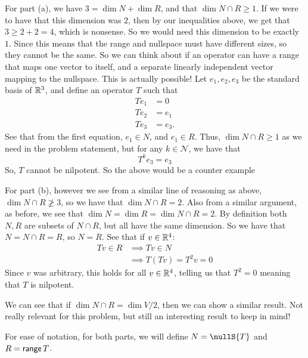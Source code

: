 \documentclass[answers]{exam}
\begin{document}
\begin{questions}
\begin{solution}
        For part (a), we have $3 = \dim{N} + \dim{R}$, and that $\dim{N\cap R} \geq 1$. If we were to have that
        this dimension was $2$, then by our inequalities above, we get that $3\geq 2 + 2 = 4$, which is nonsense. 
        So we would need this dimension to be exactly $1$. Since this means that the range and nullspace must have
        different sizes, so they cannot be the same. So we can think about if an operator can have a range that maps
        one vector to itself, and a separate linearly independent vector mapping to the nullspace. This is 
        actually possible! Let $e_1,e_2,e_3$ be the standard basis of $\mathbb{R}^3$, and define an operator $T$ such that
        \begin{align*}
            Te_1 &= 0\\
            Te_2 &= e_1\\
            Te_3 &= e_3.
        \end{align*}
        See that from the first equation, $e_1\in N$, and $e_1\in R$. Thus, $\dim{N\cap R}\geq 1$ as we need in
        the problem statement, but for any $k\in\mathcal{N}$, we have that 
        \[
            T^ke_3 = e_3
        \]
        So, $T$ cannot be nilpotent. So the above would be a counter example

        For part (b), however we see from a similar line of reasoning as above, $\dim{N\cap R} \not\geq 3$, so we 
        have that $\dim{N\cap R} = 2$. Also from a similar argument, as before, we see that $\dim{N} = \dim{R} =
        \dim{N\cap R} = 2$. By definition both $N,R$ are subsets of $N\cap R$, but all have the same dimension.
        So we have that $N = N\cap R = R$, so $N = R$. See that if $v\in \mathbb{R}^4$:
        \begin{align*}
            Tv\in R &\implies Tv\in N \\
            &\implies T(Tv) = T^2v = 0
        \end{align*}
        Since $v$ was arbitrary, this holds for all $v\in\mathbb{R}^4$, telling us that $T^2=0$ meaning that $T$ is 
        nilpotent.

         We can see that if $\dim{N\cap R} = \dim{V}/2$, then we can show a similar result. Not
        really relevant for this problem, but still an interesting result to keep in mind!



        For ease of notation, for both parts, we will define $N = \nullS{T}$ and $R = \mathsf{range}\,{T}$.
        \begin{parts}

\end{parts}
\end{solution}
\end{questions}
\end{document}
